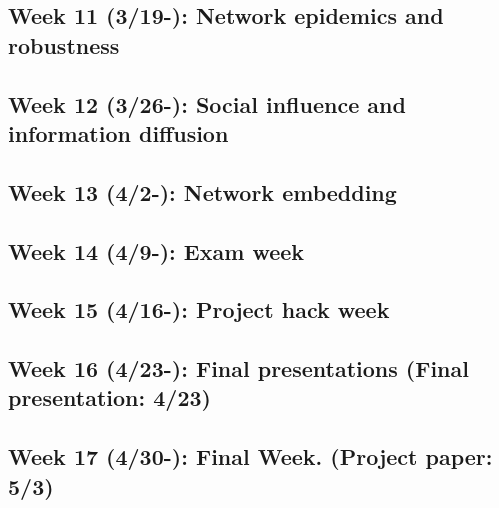 \documentclass[11pt,article,oneside]{memoir} %
\begin{document}
\subsection{Week 11 (3/19-): Network epidemics and robustness}
\subsection{Week 12 (3/26-): Social influence and information diffusion}
\subsection{Week 13 (4/2-): Network embedding}
\subsection{Week 14 (4/9-): Exam week}
\subsection{Week 15 (4/16-): Project hack week}
\subsection{Week 16 (4/23-): Final presentations (Final presentation: 4/23)}
\subsection{Week 17 (4/30-): Final Week. (Project paper: 5/3)}

\end{document}
